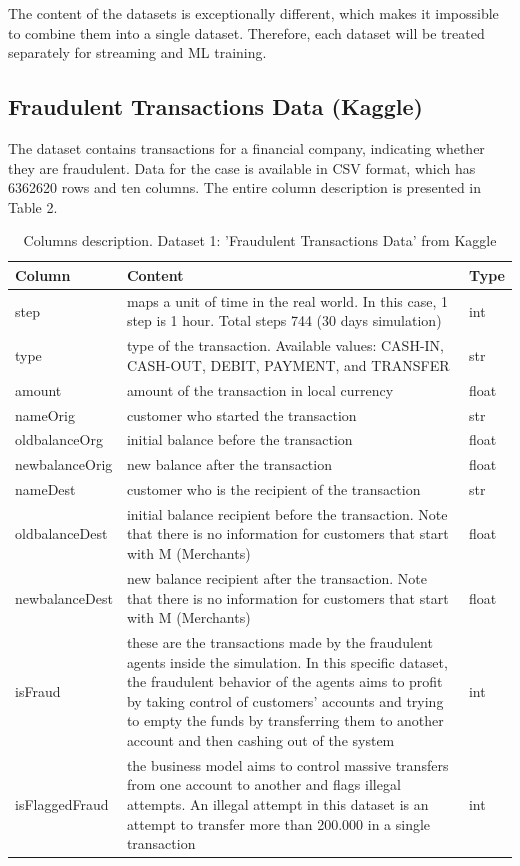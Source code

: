 \documentclass[12pt,a4paper, hidelinks]{article}
\begin{document}
The content of the datasets is exceptionally different, which makes it impossible to combine them into a single dataset. Therefore, each dataset will be treated separately for streaming and ML training.


\subsection{Fraudulent Transactions Data (Kaggle)}

The dataset contains transactions for a financial company, indicating whether they are fraudulent. Data for the case is available in CSV format, which has 6362620 rows and ten columns. The entire column description is presented in Table 2.

\begin{table}[ht!]
\centering
\begin{tabular}{|p{3cm}|p{9.8cm}|p{2cm}|}
\hline
\textbf{Column} & \textbf{Content} & \textbf{Type} \\
\hline
step & maps a unit of time in the real world. In this case, 1 step is 1 hour. Total steps 744 (30 days simulation) & int \\
\hline
type & type of the transaction. Available values: CASH-IN, CASH-OUT, DEBIT, PAYMENT, and TRANSFER & str \\
\hline
amount & amount of the transaction in local currency & float \\
\hline
nameOrig & customer who started the transaction & str \\
\hline
oldbalanceOrg & initial balance before the transaction & float \\
\hline
newbalanceOrig & new balance after the transaction & float \\
\hline
nameDest & customer who is the recipient of the transaction & str \\
\hline
oldbalanceDest & initial balance recipient before the transaction. Note that there is no information for customers that start with M (Merchants) & float \\
\hline
newbalanceDest & new balance recipient after the transaction. Note that there is no information for customers that start with M (Merchants) & float \\
\hline
isFraud & these are the transactions made by the fraudulent agents inside the simulation. In this specific dataset, the fraudulent behavior of the agents aims to profit by taking control of customers' accounts and trying to empty the funds by transferring them to another account and then cashing out of the system & int \\
\hline
isFlaggedFraud & the business model aims to control massive transfers from one account to another and flags illegal attempts. An illegal attempt in this dataset is an attempt to transfer more than 200.000 in a single transaction & int \\
\hline
\end{tabular}
\caption{Columns description. Dataset 1: 'Fraudulent Transactions Data' from Kaggle}
\end{table}
\end{document}
